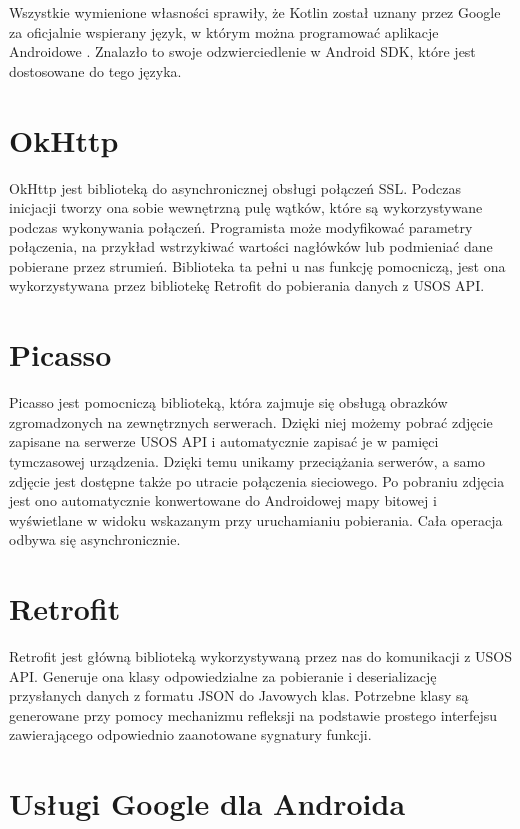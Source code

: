 \documentclass{pracamgr}
\begin{document}
Wszystkie wymienione własności sprawiły, że Kotlin został uznany przez
Google za oficjalnie wspierany język, w którym można programować aplikacje
Androidowe \cite{kotlinandroid}. Znalazło to swoje odzwierciedlenie w Android SDK,
które jest dostosowane do tego języka.

\section{OkHttp}

OkHttp \cite{okhttp} jest biblioteką do asynchronicznej obsługi połączeń SSL.
Podczas inicjacji tworzy ona sobie wewnętrzną pulę wątków, które są wykorzystywane
podczas wykonywania połączeń. Programista może modyfikować parametry połączenia,
na przykład wstrzykiwać wartości nagłówków lub podmieniać dane pobierane przez
strumień. Biblioteka ta pełni u nas funkcję pomocniczą, jest ona wykorzystywana
przez bibliotekę Retrofit do pobierania danych z USOS API.

\section{Picasso}

Picasso \cite{picasso} jest pomocniczą biblioteką, która zajmuje się obsługą
obrazków zgromadzonych na zewnętrznych serwerach. Dzięki niej możemy pobrać
zdjęcie zapisane na serwerze USOS API i automatycznie zapisać je w pamięci
tymczasowej urządzenia. Dzięki temu unikamy przeciążania serwerów, a samo zdjęcie
jest dostępne także po utracie połączenia sieciowego. Po pobraniu zdjęcia
jest ono automatycznie konwertowane do Androidowej mapy bitowej i wyświetlane w
widoku wskazanym przy uruchamianiu pobierania. Cała operacja odbywa się asynchronicznie.

\section{Retrofit}

Retrofit \cite{retrofit} jest główną biblioteką wykorzystywaną przez nas do
komunikacji z USOS API. Generuje ona klasy odpowiedzialne za pobieranie i
deserializację przysłanych danych z formatu JSON do Javowych klas. Potrzebne klasy
są generowane przy pomocy mechanizmu refleksji na podstawie prostego interfejsu
zawierającego odpowiednio zaanotowane sygnatury funkcji.

\section{Usługi Google dla Androida}
\end{document}
